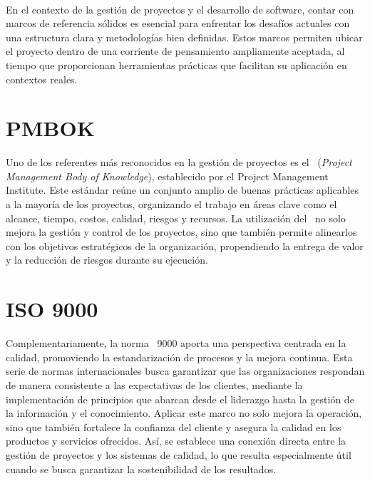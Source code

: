 \label{cap:marcoTeorico}
\mbox{}\\
En el contexto de la gestión de proyectos y el desarrollo de software, contar con marcos de referencia sólidos es esencial para enfrentar los desafíos actuales con una estructura clara y metodologías bien definidas. Estos marcos permiten ubicar el proyecto dentro de una corriente de pensamiento ampliamente aceptada, al tiempo que proporcionan herramientas prácticas que facilitan su aplicación en contextos reales. 

\section{PMBOK}
Uno de los referentes más reconocidos en la gestión de proyectos es el \PMBOK\ (\textit{Project Management Body of Knowledge}), establecido por el Project Management Institute. Este estándar reúne un conjunto amplio de buenas prácticas aplicables a la mayoría de los proyectos, organizando el trabajo en áreas clave como el alcance, tiempo, costos, calidad, riesgos y recursos\citep{project2017guia}. La utilización del \PMBOK\ no solo mejora la gestión y control de los proyectos, sino que también permite alinearlos con los objetivos estratégicos de la organización, propendiendo la entrega de valor y la reducción de riesgos durante su ejecución\citep{Monday2022}.

\section{ISO 9000}
Complementariamente, la norma \ISO\ 9000 aporta una perspectiva centrada en la calidad, promoviendo la estandarización de procesos y la mejora continua\citep{ISO9001}. Esta serie de normas internacionales busca garantizar que las organizaciones respondan de manera consistente a las expectativas de los clientes, mediante la implementación de principios que abarcan desde el liderazgo hasta la gestión de la información y el conocimiento. Aplicar este marco no solo mejora la operación, sino que también fortalece la confianza del cliente y asegura la calidad en los productos y servicios ofrecidos\citep{Gray2022}. Así, se establece una conexión directa entre la gestión de proyectos y los sistemas de calidad, lo que resulta especialmente útil cuando se busca garantizar la sostenibilidad de los resultados.

